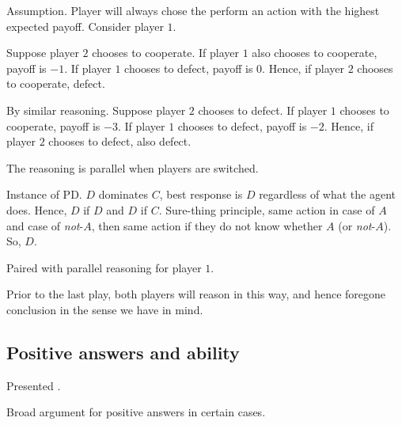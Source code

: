 \begin{note}
  Assumption.
  Player will always chose the perform an action with the highest expected payoff.
  Consider player \(1\).

  Suppose player \(2\) chooses to cooperate.
  If player \(1\) also chooses to cooperate, payoff is \(-1\).
  If player \(1\) chooses to defect, payoff is \(0\).
  Hence, if player \(2\) chooses to cooperate, defect.

  By similar reasoning.
  Suppose player \(2\) chooses to defect.
  If player \(1\) chooses to cooperate, payoff is \(-3\).
  If player \(1\) chooses to defect, payoff is \(-2\).
  Hence, if player \(2\) chooses to defect, also defect.

  The reasoning is parallel when players are switched.

  Instance of PD.
  \(D\) dominates \(C\), best response is \(D\) regardless of what the agent does.
  Hence, \(D\) if \(D\) and \(D\) if \(C\).
  Sure-thing principle, same action in case of \(A\) and case of \emph{not}-\(A\), then same action if they do not know whether \(A\) (or \emph{not}-\(A\)).
  So, \(D\).

  Paired with parallel reasoning for player \(1\).

  Prior to the last play, both players will reason in this way, and hence foregone conclusion in the sense we have in mind.
\end{note}

\subsection{Positive answers and ability}
\label{sec:posit-answ-abil}

\begin{note}
  Presented .

  Broad argument for positive answers in certain cases.
\end{note}

